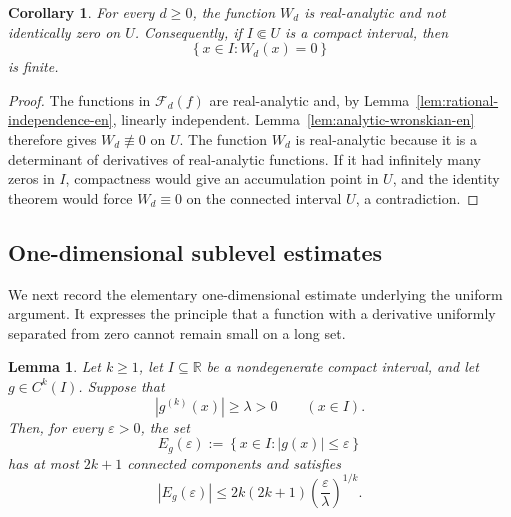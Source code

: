\documentclass[11pt]{amsart}
\numberwithin{equation}{section}
\newtheorem{lemma}[lemma]{Lemma}
\newtheorem{corollary}[corollary]{Corollary}
\theoremstyle{definition}
\theoremstyle{remark}
\newcommand{\R}{\mathbb R}
\newcommand{\abs}[1]{\left\lvert #1\right\rvert}
\newcommand{\set}[1]{\left\{#1\right\}}
\newcommand{\eps}{\varepsilon}
\begin{document}
\begin{corollary}\label{cor:wronskian-finite-en}
For every $d\geq0$, the function $W_d$ is real-analytic and not
identically zero on $U$. Consequently, if $I\Subset U$ is a compact
interval, then
\[
\set{x\in I:W_d(x)=0}
\]
is finite.
\end{corollary}

\begin{proof}
The functions in $\mathcal F_d(f)$ are real-analytic and, by
Lemma~\ref{lem:rational-independence-en}, linearly independent.
Lemma~\ref{lem:analytic-wronskian-en} therefore gives
$W_d\not\equiv0$ on $U$. The function $W_d$ is real-analytic because
it is a determinant of derivatives of real-analytic functions. If it
had infinitely many zeros in $I$, compactness would give an
accumulation point in $U$, and the identity theorem would force
$W_d\equiv0$ on the connected interval $U$, a contradiction.
\end{proof}

\subsection{One-dimensional sublevel estimates}

We next record the elementary one-dimensional estimate underlying the
uniform argument. It expresses the principle that a function with a
derivative uniformly separated from zero cannot remain small on a
long set.

\begin{lemma}\label{lem:one-derivative-en}
Let $k\geq1$, let $I\subseteq\R$ be a nondegenerate compact interval,
and let $g\in C^k(I)$. Suppose that
\begin{equation}\label{eq:kth-lower-en}
\abs{g^{(k)}(x)}\geq\lambda>0
\qquad(x\in I).
\end{equation}
Then, for every $\eps>0$, the set
\[
E_g(\eps):=\set{x\in I:\abs{g(x)}\leq\eps}
\]
has at most $2k+1$ connected components and satisfies
\begin{equation}\label{eq:one-derivative-length-en}
|E_g(\eps)|
\leq
2k(2k+1)
\left(\frac{\eps}{\lambda}\right)^{1/k}.
\end{equation}
\end{lemma}
\end{document}

